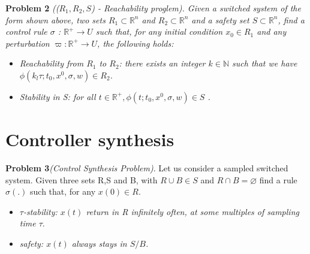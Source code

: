  
 \textbf{Problem 2} \emph{((${R_1,R_2,S}$) - Reachability proglem). Given a switched system of the form shown above, two sets  ${ R_1 \subset \mathbb{R}^n}$  and ${ R_2 \subset \mathbb{R}^n}$ and a safety set  ${S \subset  \mathbb{R}^n}$, find a control rule ${\sigma}$ : ${\mathbb{R}^+\rightarrow U}$ such that, for any initial condition ${x_0  \in  R_1}$ and any perturbation  ${\varpi : \mathbb{R}^+  \rightarrow U}$, the following holds:}
 
 \begin{itemize}
    \item  \emph{Reachability from ${R_1}$ to ${R_2}$: there exists an integer  ${k \in \mathbb{N} }$ such that we have ${ \phi( k_l\tau;t_0,x^0,\sigma,w) \in R_2 }$.}
    
    \item \emph{ Stability in S: for all ${ t \in \mathbb{R}^+, \phi(t;t_0,x^0,\sigma,w) \in S}$ .}
\end{itemize}
 
 \section{Controller synthesis}
 
 \textbf{Problem 3}\emph{(Control Synthesis Problem)}. Let us consider a sampled switched system. Given three sets R,S and B, with ${R \cup B \in S}$  and ${R \cap B = \varnothing }$ find a rule ${\sigma(.)}$ such that, for any ${x(0) \in R }$. 
 \begin{itemize}
    \item \emph{ ${\tau}$-stability: ${x(t)}$ return in R infinitely often, at some multiples of sampling time ${\tau}$}.
    \item \emph{ safety: ${x(t)}$ always stays in ${S/B}$.}
\end{itemize}



